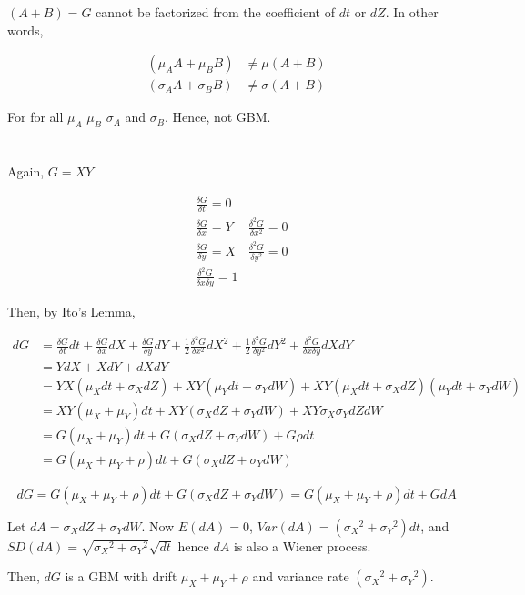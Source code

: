 \documentclass[11pt]{scrartcl}
\renewcommand{\dfrac}[2]{\ensuremath{\frac{\delta #1}{\delta #2}}}
\newcommand{\ddfrac}[2]{\ensuremath{\frac{\delta^2 #1}{\delta #2^2}}}
\newcommand{\dddfrac}[3]{\ensuremath{\frac{\delta^2 #1}{\delta #2 \delta #3}}}
\newcommand{\mux}{\ensuremath{\mu_X}}
\newcommand{\muy}{\ensuremath{\mu_Y}}
\newcommand{\six}{\ensuremath{\sigma_X}}
\newcommand{\siy}{\ensuremath{\sigma_Y}}
\begin{document}
$(A+B) = G$ cannot be factorized from the coefficient of $dt$ or $dZ$. In other words, 

\begin{align*}
(\mu_A A + \mu_B B) &\neq \mu(A+B) \\
(\sigma_A A + \sigma_B B) &\neq \sigma(A+B)
\end{align*}

For for all $\mu_A$ $\mu_B$ $\sigma_A$ and $\sigma_B$. Hence, not GBM.

\section{}

Again, $G=XY$

\begin{align*}
&\dfrac{G}{t} = 0 &\\
&\dfrac{G}{x} = Y &\ddfrac{G}{x} = 0 \\
&\dfrac{G}{y} = X &\ddfrac{G}{y} = 0 \\
&\dddfrac{G}{x}{y} = 1
\end{align*}

Then, by Ito's Lemma,

\begin{align*}
dG &= \dfrac{G}{t}dt + \dfrac{G}{x}dX + \dfrac{G}{y}dY + \frac{1}{2}\ddfrac{G}{x}dX^2 + \frac{1}{2}\ddfrac{G}{y}dY^2 + \dddfrac{G}{x}{y}dXdY \\
&= YdX + XdY + dXdY \\
&= YX(\mux dt + \six dZ) + XY(\muy dt + \siy dW) + XY(\mux dt + \six dZ)(\muy dt + \siy dW) \\
&= XY(\mux + \muy)dt + XY(\six dZ + \siy dW) +  XY\six \siy dZdW \\
&= G(\mux + \muy)dt + G(\six dZ + \siy dW) + G\rho dt \\
&= G(\mux + \muy + \rho)dt + G(\six dZ + \siy dW)
\end{align*}

\[dG = G(\mux + \muy + \rho)dt + G(\six dZ + \siy dW) = G(\mux + \muy + \rho)dt + GdA\]

Let $dA = \six dZ + \siy dW$. Now $E(dA) = 0$, $Var(dA) = (\six^2 + \siy^2) dt$, and $SD(dA) = \sqrt{\six^2 + \siy^2} \sqrt{dt}$ hence $dA$ is also a Wiener process.

Then, $dG$ is a GBM with drift $\mux + \muy + \rho$ and variance rate $(\six^2 + \siy^2)$.

\section{}
\end{document}

